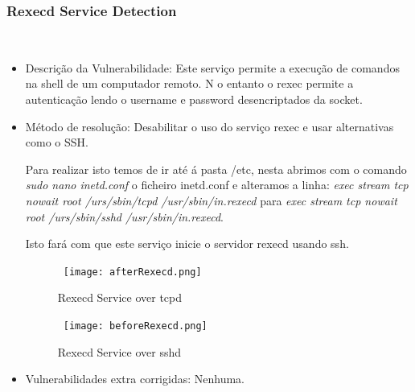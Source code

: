 \subsubsection{Rexecd Service Detection}
\hfill\\
\begin{itemize}
\item Descrição da Vulnerabilidade: Este serviço permite a execução de comandos na shell de um computador remoto. N o entanto o rexec permite a autenticação lendo o username e password desencriptados da socket.

\item Método de resolução: Desabilitar o uso do serviço rexec e usar alternativas como o SSH.
\par Para realizar isto temos de ir até á pasta /etc, nesta abrimos com o comando \textit{sudo nano inetd.conf} o ficheiro inetd.conf e alteramos a linha: \textit{exec   stream    tcp  nowait  root /urs/sbin/tcpd  /usr/sbin/in.rexecd} para \textit{exec   stream    tcp  nowait  root /urs/sbin/sshd  /usr/sbin/in.rexecd}.
\par Isto fará com que este serviço inicie o servidor rexecd usando ssh. 
\begin{figure}[H]

  \centering

  \hbox{\hspace{-6em} \texttt{[image: afterRexecd.png]}}

  \caption {Rexecd Service over tcpd}

  \label {fig3}

\end{figure}
\begin{figure}[H]

  \centering

  \hbox{\hspace{-6em} \texttt{[image: beforeRexecd.png]}}

  \caption {Rexecd Service over sshd}

  \label {fig3}

\end{figure}
\item Vulnerabilidades extra corrigidas: Nenhuma.
\end{itemize}

